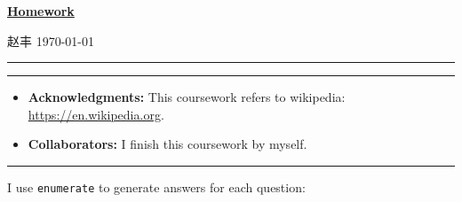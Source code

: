 \documentclass[a4paper]{article}
\begin{document}
\courseheader

\setcounter{hwcnt}{3} %

\begin{center}
  \underline{\bf Homework \thehwcnt} \\
\end{center}
\begin{flushleft}
  赵丰\hfill
  \today
\end{flushleft}
\hrule

\vspace{2em}

\flushleft
\rule{\textwidth}{1pt}
\begin{itemize}
\item {\bf Acknowledgments: \/} 
  This coursework refers to wikipedia: \small{\url{https://en.wikipedia.org}}.

\item {\bf Collaborators: \/}
  I finish this coursework by myself.
\end{itemize}
\rule{\textwidth}{1pt}

\vspace{2em}

I use \texttt{enumerate} to generate answers for each question:
\end{document}
